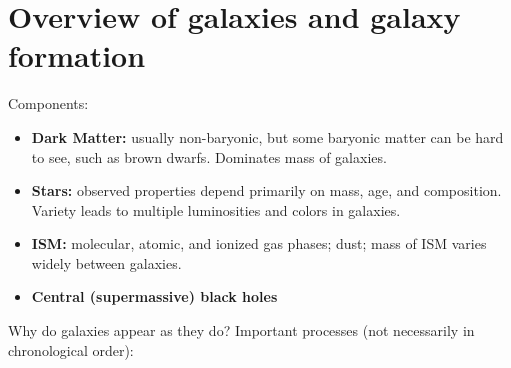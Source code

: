 \documentclass{article}
\begin{document}
\section{Overview of galaxies and galaxy formation}
Components:
\begin{itemize}
    \item \textbf{Dark Matter:} usually non-baryonic, but some baryonic matter
        can be hard to see, such as brown dwarfs. Dominates mass of
        galaxies.
    \item \textbf{Stars:} observed properties depend primarily on mass, age,
        and composition. Variety leads to multiple luminosities and colors
        in galaxies.
    \item \textbf{ISM:} molecular, atomic, and ionized gas phases; dust; mass
        of ISM varies widely between galaxies.
    \item \textbf{Central (supermassive) black holes}
\end{itemize}
Why do galaxies appear as they do? Important processes (not necessarily
in chronological order):
\end{document}
